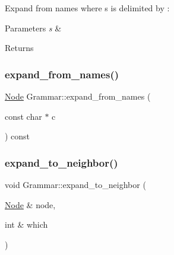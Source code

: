 Expand from names where s is delimited by \textquotesingle{}\+:\textquotesingle{} 
\begin{DoxyParams}{Parameters}
{\em s} & \\
\hline
\end{DoxyParams}
\begin{DoxyReturn}{Returns}

\end{DoxyReturn}
\mbox{\label{class_grammar_a0addff494602ebb19852c2d4314eaac6}} 
\subsubsection{\texorpdfstring{expand\+\_\+from\+\_\+names()}{expand\_from\_names()}\hspace{0.1cm}{\footnotesize\ttfamily [3/3]}}
{\footnotesize\ttfamily \hyperlink{class_node}{Node} Grammar\+::expand\+\_\+from\+\_\+names (\begin{DoxyParamCaption}\item[{const char $\ast$}]{c }\end{DoxyParamCaption}) const\hspace{0.3cm}{\ttfamily [inline]}}

\mbox{\label{class_grammar_abd380ec308907ddc26acb22196610b83}} 
\subsubsection{\texorpdfstring{expand\+\_\+to\+\_\+neighbor()}{expand\_to\_neighbor()}}
{\footnotesize\ttfamily void Grammar\+::expand\+\_\+to\+\_\+neighbor (\begin{DoxyParamCaption}\item[{\hyperlink{class_node}{Node} \&}]{node,  }\item[{int \&}]{which }\end{DoxyParamCaption})\hspace{0.3cm}{\ttfamily [inline]}}

\mbox{\label{class_grammar_a6a08c44dbbba7406d3638bdc549fddad}} 
